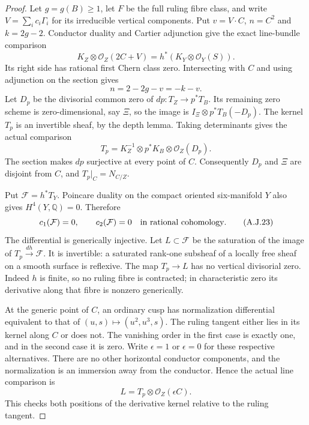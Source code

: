 \begin{proof}
Let $g=g(B)\geq1$, let $F$ be the full ruling fibre
class, and write $V=\sum_i c_i\Gamma_i$ for its
irreducible vertical components. Put
$v=V\cdot C$, $n=C^2$ and $k=2g-2$.
Conductor duality and Cartier adjunction give the exact
line-bundle comparison
\[
 K_Z\otimes\mathcal O_Z(2C+V)
       =h^*(K_Y\otimes\mathcal O_Y(S)).
                                                        \tag{A.J.21}
\]
Its right side has rational first Chern class zero.
Intersecting with $C$ and using adjunction on the section
gives
\[
 n=2-2g-v=-k-v.                                  \tag{A.J.22}
\]
Let $D_p$ be the divisorial common zero of
$dp:T_Z\to p^*T_B$. Its remaining zero scheme is
zero-dimensional, say $\Xi$, so the image is
$I_\Xi\otimes p^*T_B(-D_p)$.
The kernel $T_p$ is an invertible sheaf, by the depth
lemma. Taking determinants gives the actual comparison
\[
 T_p=K_Z^{-1}\otimes p^*K_B\otimes\mathcal O_Z(D_p).
\]
The section makes $dp$ surjective at every point of $C$.
Consequently $D_p$ and $\Xi$ are disjoint from $C$,
and $T_p|_C=N_{C/Z}$.

Put $\mathcal F=h^*T_Y$. Poincare duality on the compact
oriented six-manifold $Y$ also gives
$H^4(Y,\mathbb Q)=0$. Therefore
\[
 c_1(\mathcal F)=0,\qquad c_2(\mathcal F)=0
        \quad\hbox{in rational cohomology}.       \tag{A.J.23}
\]
The differential is generically injective. Let
$L\subset\mathcal F$ be the saturation of the image
of $T_p\xrightarrow{dh}\mathcal F$.
It is invertible: a saturated rank-one subsheaf of a
locally free sheaf on a smooth surface is reflexive.
The map $T_p\to L$ has no vertical divisorial zero.
Indeed $h$ is finite, so no ruling fibre is contracted;
in characteristic zero its derivative along that fibre
is nonzero generically.

At the generic point of $C$, an ordinary cusp has
normalization differential equivalent to that of
$(u,s)\mapsto(u^2,u^3,s)$.
The ruling tangent either lies in its kernel along $C$
or does not. The vanishing order in the first case is
exactly one, and in the second case it is zero.
Write $\epsilon=1$ or $\epsilon=0$ for these respective
alternatives. There are no other horizontal conductor
components, and the normalization is an immersion away
from the conductor. Hence the actual line comparison is
\[
 L=T_p\otimes\mathcal O_Z(\epsilon C).
                                                        \tag{A.J.24}
\]
This checks both positions of the derivative kernel
relative to the ruling tangent.


\end{proof}
